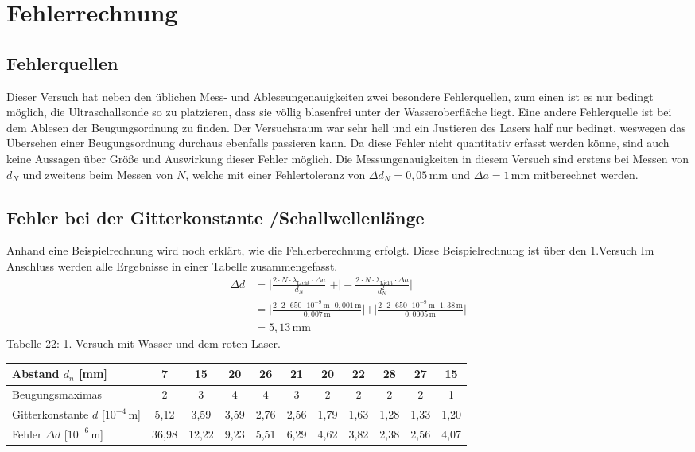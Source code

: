 \documentclass[fontsize=12pt]{scrartcl}
\begin{document}
\newpage

\section{Fehlerrechnung}

\subsection{Fehlerquellen}

Dieser Versuch hat neben den üblichen Mess- und Ableseungenauigkeiten zwei besondere Fehlerquellen, zum einen ist es nur bedingt möglich, die Ultraschallsonde so zu platzieren, dass sie völlig blasenfrei unter der Wasseroberfläche liegt. Eine andere Fehlerquelle ist bei dem Ablesen der Beugungsordnung zu finden. Der Versuchsraum war sehr hell und ein Justieren des Lasers half nur bedingt, weswegen das Übersehen einer Beugungsordnung durchaus ebenfalls passieren kann. Da diese Fehler nicht quantitativ erfasst werden könne, sind auch keine Aussagen über Größe und Auswirkung dieser Fehler möglich. Die Messungenauigkeiten in diesem Versuch sind erstens bei Messen von $d_N$ und zweitens beim Messen von $N$, welche mit einer Fehlertoleranz von $\Delta d_N = 0,05\,\text{mm}$ und $\Delta a= 1\,{\text{mm}}$ mitberechnet werden.

\subsection{Fehler bei der Gitterkonstante /Schallwellenlänge}
Anhand eine Beispielrechnung wird noch erklärt, wie die Fehlerberechnung erfolgt. Diese Beispielrechnung ist über den 1.Versuch Im Anschluss werden alle Ergebnisse in einer Tabelle zusammengefasst. \\
\begin{align*}
\Delta d &=  \vert \frac{2 \cdot N \cdot \lambda_{\text{Licht}}\cdot \Delta a}{d_N}\vert 
+ \vert - \frac{2 \cdot N \cdot \lambda_{\text{Licht}}\cdot \Delta a}{d^2_N}\vert \\
&= \vert\frac{2 \cdot 2 \cdot 650 \cdot 10^{-9}\,{\text{m}} \cdot  0,001\,{\text{m}}}{0,007\,{\text{m}}} \vert 
+ \vert \frac{2 \cdot 2 \cdot 650 \cdot 10^{-9}\,{\text{m}} \cdot  1,38\,{\text{m}}}{0,0005\,{\text{m}}} \vert \\
&= 5,13 \,\text{mm}
\end{align*}
\newpage
\noindent
Tabelle 22: 1. Versuch mit Wasser und dem roten Laser. \\
\begin{tabular}{|l|c|c|c|c|c|c|c|c|c|c|} \hline
Abstand $d_n$ [mm] & 7 & 15 & 20 & 26 & 21 & 20 & 22 & 28 & 27 & 15 \\ \hline
Beugungsmaximas & 2 & 3 & 4 & 4 & 3 & 2 & 2 & 2 & 2 & 1 \\ \hline 
Gitterkonstante $d$ [$10^{-4}$\,m] & 5,12 & 3,59 & 3,59 & 2,76 & 2,56 & 1,79 & 1,63 & 1,28 & 1,33 & 1,20 \\ \hline
Fehler $\Delta d$ [$10^{-6}$\,m] & 36,98 & 12,22 & 9,23 & 5,51 & 6,29 & 4,62 & 3,82 & 2,38 &  2,56 & 4,07  \\ \hline
\end{tabular}\\
\end{document}
